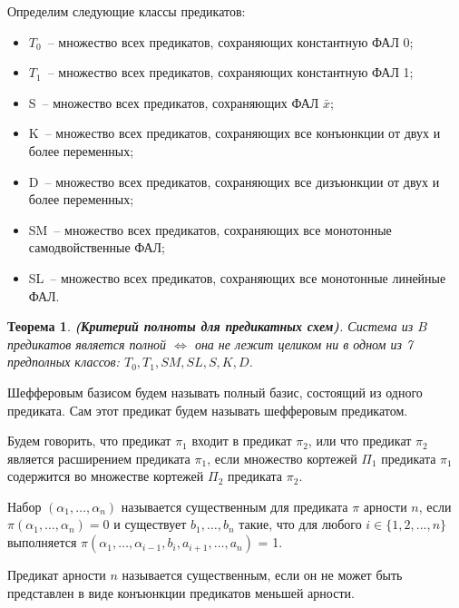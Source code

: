 \documentclass[12pt]{article}
\newtheorem{theorem}{Теорема}[section]
\newenvironment{definition}[1][Определение]{\begin{trivlist}
\item[\hskip \labelsep {\bfseries #1}]}{\end{trivlist}}
\begin{document}
Определим следующие классы предикатов:
\begin{itemize}
    \item{$T_0$}~-- множество всех предикатов, сохраняющих константную ФАЛ 0;
    \item{$T_1$}~-- множество всех предикатов, сохраняющих константную ФАЛ 1;
    \item{S}~-- множество всех предикатов, сохраняющих ФАЛ $\bar{x}$;
    \item{K}~-- множество всех предикатов, сохраняющих все конъюнкции от двух и более переменных;
    \item{D}~-- множество всех предикатов, сохраняющих все дизъюнкции от двух и более переменных;
    \item{SM}~-- множество всех предикатов, сохраняющих все монотонные самодвойственные ФАЛ;
    \item{SL}~-- множество всех предикатов, сохраняющих все монотонные линейные ФАЛ.
\end{itemize}

\begin{theorem}
\label{Post}
\textbf{(Критерий полноты для предикатных схем)}. Система из $B$ предикатов является полной $\iff$
она не лежит целиком ни в одном из 7 предполных классов: $T_0, T_1, SM, SL, S, K, D$. \cite{Shu11} 
\end{theorem}

\begin{definition}
Шефферовым базисом будем называть полный базис, состоящий из одного предиката. Сам этот предикат
будем называть шефферовым предикатом.
\end{definition}


\begin{definition}
Будем говорить, что предикат $\pi_1$ входит в предикат $\pi_2$, или что предикат $\pi_2$ является
расширением предиката $\pi_1$, если множество кортежей $\Pi_1$ предиката $\pi_1$ 
содержится во множестве кортежей $\Pi_2$ предиката $\pi_2$.
\end{definition}

\begin{definition}
Набор $(\alpha_1, \dots, \alpha_n)$ называется существенным для предиката $\pi$ арности $n$, если
$\pi(\alpha_1, \dots, \alpha_n) = 0$ и существует $b_1, \dots, b_n$ такие, что для любого $i \in \{ 1, 2, \dots, n\}$
выполняется 
$\pi(\alpha_1, \dots, \alpha_{i-1}, b_i, a_{i+1}, \dots, a_n)$ = 1.
\end{definition}

\begin{definition}
Предикат арности $n$ называется существенным, если он не может быть представлен в виде конъюнкции
предикатов меньшей арности.
\end{definition}
\end{document}
